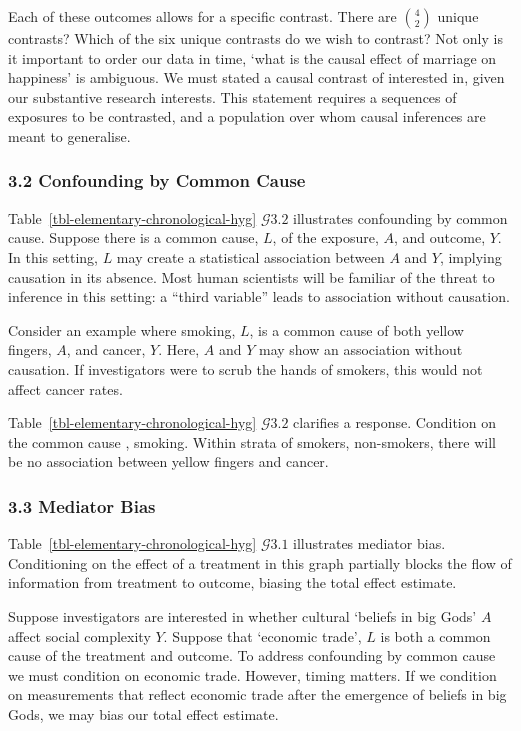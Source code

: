 \documentclass[
  single column]{article}
\begin{document}
Each of these outcomes allows for a specific contrast. There are
\(\binom{4}{2}\) unique contrasts? Which of the six unique contrasts do
we wish to contrast? Not only is it important to order our data in time,
`what is the causal effect of marriage on happiness' is ambiguous. We
must stated a causal contrast of interested in, given our substantive
research interests. This statement requires a sequences of exposures to
be contrasted, and a population over whom causal inferences are meant to
generalise.

\subsubsection{3.2 Confounding by Common
Cause}\label{confounding-by-common-cause}

Table~\ref{tbl-elementary-chronological-hyg} \(\mathcal{G} 3.2\)
illustrates confounding by common cause. Suppose there is a common
cause, \(L\), of the exposure, \(A\), and outcome, \(Y\). In this
setting, \(L\) may create a statistical association between \(A\) and
\(Y\), implying causation in its absence. Most human scientists will be
familiar of the threat to inference in this setting: a ``third
variable'' leads to association without causation.

Consider an example where smoking, \(L\), is a common cause of both
yellow fingers, \(A\), and cancer, \(Y\). Here, \(A\) and \(Y\) may show
an association without causation. If investigators were to scrub the
hands of smokers, this would not affect cancer rates.

Table~\ref{tbl-elementary-chronological-hyg} \(\mathcal{G} 3.2\)
clarifies a response. Condition on the common cause , smoking. Within
strata of smokers, non-smokers, there will be no association between
yellow fingers and cancer.

\subsubsection{3.3 Mediator Bias}\label{mediator-bias}

Table~\ref{tbl-elementary-chronological-hyg} \(\mathcal{G} 3.1\)
illustrates mediator bias. Conditioning on the effect of a treatment in
this graph partially blocks the flow of information from treatment to
outcome, biasing the total effect estimate.

Suppose investigators are interested in whether cultural `beliefs in big
Gods' \(A\) affect social complexity \(Y\). Suppose that `economic
trade', \(L\) is both a common cause of the treatment and outcome. To
address confounding by common cause we must condition on economic trade.
However, timing matters. If we condition on measurements that reflect
economic trade after the emergence of beliefs in big Gods, we may bias
our total effect estimate.
\end{document}
